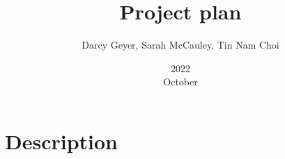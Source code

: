 \documentclass{article}
\title{Project plan}
\author{Darcy Geyer, Sarah McCauley, Tin Nam Choi}
\date{2022\\October}
\begin{document}
  \maketitle{}
  
  \tableofcontents{}
  
  \section{Description}
\end{document}
